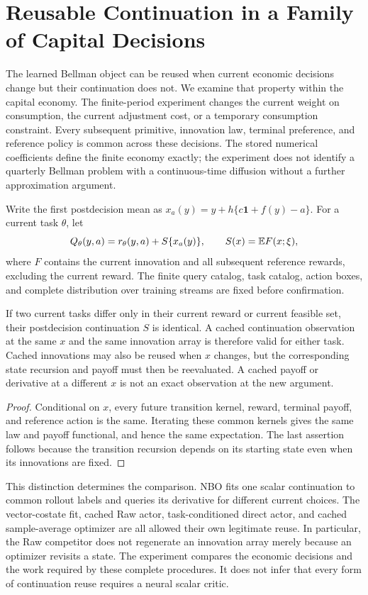 \section{Reusable Continuation in a Family of Capital Decisions}
\label{sec:r16menu}

The learned Bellman object can be reused when current economic decisions
change but their continuation does not. We examine that property within
the capital economy. The finite-period experiment changes the current
weight on consumption, the current adjustment cost, or a temporary
consumption constraint. Every subsequent primitive, innovation law,
terminal preference, and reference policy is common across these decisions.
The stored numerical coefficients define the finite economy exactly;
the experiment does not identify a quarterly Bellman problem with a
continuous-time diffusion without a further approximation argument.

Write the first postdecision mean as
$x_a(y)=y+h\{c\bm1+f(y)-a\}$. For a current task $\theta$, let
\[
 Q_\theta(y,a)=r_\theta(y,a)+S\{x_a(y)\},\qquad
 S(x)=\mathbb E F(x;\xi),
\]
where $F$ contains the current innovation and all subsequent reference
rewards, excluding the current reward. The finite query catalog, task
catalog, action boxes, and complete distribution over training streams
are fixed before confirmation.

\begin{proposition}
\label{prop:r16menucache}
If two current tasks differ only in their current reward or current
feasible set, their postdecision continuation $S$ is identical. A cached
continuation observation at the same $x$ and the same innovation array
is therefore valid for either task. Cached innovations may also be
reused when $x$ changes, but the corresponding state recursion and payoff
must then be reevaluated. A cached payoff or derivative at a different
$x$ is not an exact observation at the new argument.
\end{proposition}

\begin{proof}
Conditional on $x$, every future transition kernel, reward, terminal
payoff, and reference action is the same. Iterating these common kernels
gives the same law and payoff functional, and hence the same expectation.
The last assertion follows because the transition recursion depends on
its starting state even when its innovations are fixed.
\end{proof}

This distinction determines the comparison. NBO fits one scalar
continuation to common rollout labels and queries its derivative for
different current choices. The vector-costate fit, cached Raw actor,
task-conditioned direct actor, and cached sample-average optimizer are
all allowed their own legitimate reuse. In particular, the Raw competitor
does not regenerate an innovation array merely because an optimizer
revisits a state. The experiment compares the economic decisions and the
work required by these complete procedures. It does not infer that every
form of continuation reuse requires a neural scalar critic.


